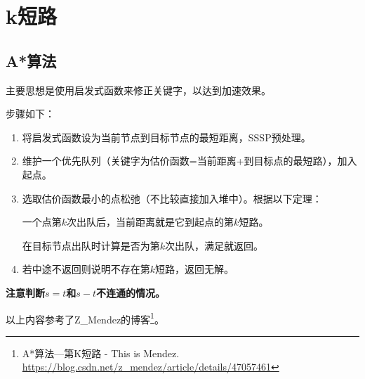 \section{k短路}
\subsection{A*算法}
主要思想是使用启发式函数来修正关键字，以达到加速效果。

步骤如下：

\begin{enumerate}
	\item 将启发式函数设为当前节点到目标节点的最短距离，SSSP预处理。
	\item 维护一个优先队列（关键字为估价函数=当前距离+到目标点的最短路），加入起点。
	\item 选取估价函数最小的点松弛（不比较直接加入堆中）。根据以下定理：
	      \begin{theorem}
		      一个点第$k$次出队后，当前距离就是它到起点的第$k$短路。
	      \end{theorem}
	      在目标节点出队时计算是否为第$k$次出队，满足就返回。
	\item 若中途不返回则说明不存在第$k$短路，返回无解。
\end{enumerate}
{\bfseries 注意判断$s=t$和$s-t$不连通的情况。}

以上内容参考了Z\_Mendez的博客\footnote{A*算法—第K短路 - This is Mendez.
	\url{https://blog.csdn.net/z\_mendez/article/details/47057461}
}。
